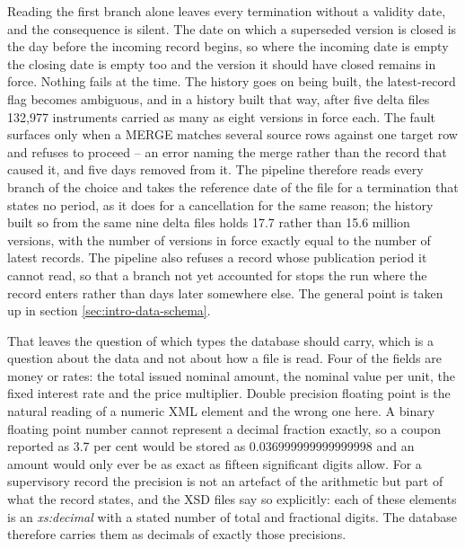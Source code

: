 Reading the first branch alone leaves every termination without a validity date, and the consequence is silent. The date on which a superseded version is closed is the day before the incoming record begins, so where the incoming date is empty the closing date is empty too and the version it should have closed remains in force. Nothing fails at the time. The history goes on being built, the latest-record flag becomes ambiguous, and in a history built that way, after five delta files 132,977 instruments carried as many as eight versions in force each. The fault surfaces only when a MERGE matches several source rows against one target row and refuses to proceed -- an error naming the merge rather than the record that caused it, and five days removed from it. The pipeline therefore reads every branch of the choice and takes the reference date of the file for a termination that states no period, as it does for a cancellation for the same reason; the history built so from the same nine delta files holds 17.7 rather than 15.6 million versions, with the number of versions in force exactly equal to the number of latest records. The pipeline also refuses a record whose publication period it cannot read, so that a branch not yet accounted for stops the run where the record enters rather than days later somewhere else. The general point is taken up in section \ref{sec:intro-data-schema}.

That leaves the question of which types the database should carry, which is a question about the data and not about how a file is read. Four of the fields are money or rates: the total issued nominal amount, the nominal value per unit, the fixed interest rate and the price multiplier. Double precision floating point is the natural reading of a numeric XML element and the wrong one here. A binary floating point number cannot represent a decimal fraction exactly, so a coupon reported as 3.7 per cent would be stored as 0.036999999999999998 and an amount would only ever be as exact as fifteen significant digits allow. For a supervisory record the precision is not an artefact of the arithmetic but part of what the record states, and the XSD files say so explicitly: each of these elements is an \emph{xs:decimal} with a stated number of total and fractional digits. The database therefore carries them as decimals of exactly those precisions.

